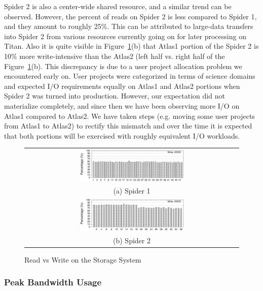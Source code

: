 Spider 2 is also a center-wide shared resource, and a similar trend can be
observed. However, the percent of reads on Spider 2 is less compared to Spider
1, and they amount to roughly 25\%. This can be attributed to large-data
transfers into Spider 2 from various resources currently going on for later
processing on Titan. Also it is quite visible in Figure~\ref{fig:rwratio}(b)
that Atlas1 portion of the Spider 2 is 10\% more write-intensive than the
Atlas2 (left half vs. right half of the Figure~\ref{fig:rwratio}(b). This
discrepancy is due to a user project allocation problem we encountered early
on. User projects were categorized in terms of science domains and expected I/O
requirements equally on Atlas1 and Atlas2 portions when Spider 2 was turned
into production. However, our expectation did not materialize completely, and
since then we have been observing more I/O on Atlas1 compared to Atlas2. We
have taken steps (e.g. moving some user projects from Atlas1 to Atlas2) to
rectify this mismatch and over the time it is expected that both portions will
be exercised with roughly equivalent I/O workloads. 

\begin{figure}[!t]
\begin{center}
\begin{tabular}{c}
{\includegraphics[width=0.5\textwidth]{./figs/spider1-wr-ratio.eps}}\\
{(a) Spider 1}\\
{\includegraphics[width=0.5\textwidth]{./figs/spider2-wr-ratio.eps}}\\
{(b) Spider 2}\\
\end{tabular}
\vspace{-0.1in}
\caption{Read vs Write on the Storage System}
\label{fig:rwratio}
\end{center}
\end{figure}

\subsubsection{Peak Bandwidth Usage}

